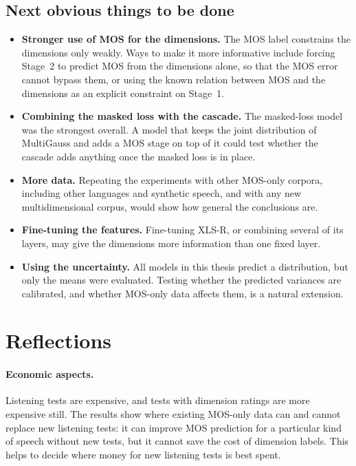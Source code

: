 \documentclass[
english,                 %
bibtex,                  %
includeExtraAbstracts, %
]{kththesis}
\numberwithin{listing}{chapter}
\begin{document}
\subsection{Next obvious things to be done}

\begin{itemize}
\item \textbf{Stronger use of MOS for the dimensions.} The MOS label constrains the dimensions only weakly. Ways to make it more informative include forcing Stage~2 to predict MOS from the dimensions alone, so that the MOS error cannot bypass them, or using the known relation between MOS and the dimensions as an explicit constraint on Stage~1.
\item \textbf{Combining the masked loss with the cascade.} The masked-loss model was the strongest overall. A model that keeps the joint distribution of MultiGauss and adds a MOS stage on top of it could test whether the cascade adds anything once the masked loss is in place.
\item \textbf{More data.} Repeating the experiments with other MOS-only corpora, including other languages and synthetic speech, and with any new multidimensional corpus, would show how general the conclusions are.
\item \textbf{Fine-tuning the features.} Fine-tuning XLS-R, or combining several of its layers, may give the dimensions more information than one fixed layer.
\item \textbf{Using the uncertainty.} All models in this thesis predict a distribution, but only the means were evaluated. Testing whether the predicted variances are calibrated, and whether MOS-only data affects them, is a natural extension.
\end{itemize}

\section{Reflections}
\label{sec:reflections}

\paragraph{Economic aspects.} Listening tests are expensive, and tests with dimension ratings are more expensive still. The results show where existing MOS-only data can and cannot replace new listening tests: it can improve MOS prediction for a particular kind of speech without new tests, but it cannot save the cost of dimension labels. This helps to decide where money for new listening tests is best spent.
\end{document}
